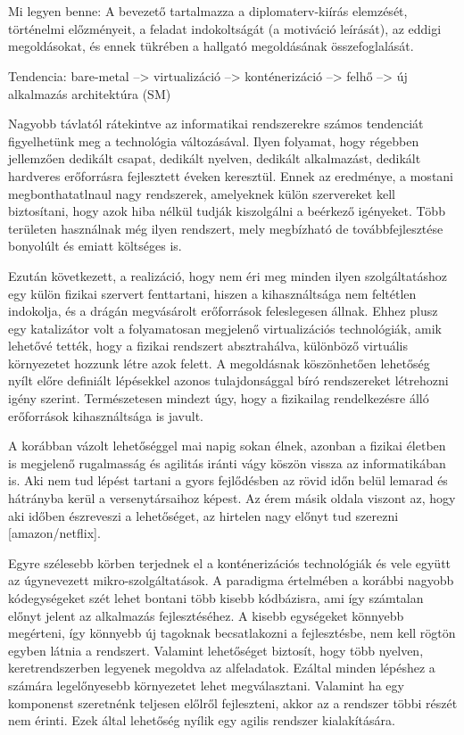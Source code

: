\chapter{\bevezetes}

Mi legyen benne:
A bevezető tartalmazza a diplomaterv-kiírás elemzését, történelmi előzményeit, a feladat indokoltságát (a motiváció leírását), az eddigi megoldásokat, és ennek tükrében a hallgató megoldásának összefoglalását.

Tendencia: bare-metal --> virtualizáció --> konténerizáció --> felhő --> új alkalmazás architektúra (SM) 

Nagyobb távlatól rátekintve az informatikai rendszerekre számos tendenciát figyelhetünk meg a technológia változásával. Ilyen folyamat, hogy régebben jellemzően dedikált csapat, dedikált nyelven, dedikált alkalmazást, dedikált hardveres erőforrásra fejlesztett éveken keresztül. Ennek az eredménye, a mostani megbonthatatlnaul nagy rendszerek, amelyeknek külön szervereket kell biztosítani, hogy azok hiba nélkül tudják kiszolgálni a beérkező igényeket. Több területen használnak még ilyen rendszert, mely megbízható de továbbfejlesztése bonyolúlt és emiatt költséges is.

Ezután következett, a realizáció, hogy nem éri meg minden ilyen szolgáltatáshoz egy külön fizikai szervert fenttartani, hiszen a kihasználtsága nem feltétlen indokolja, és a drágán megvásárolt erőforrások feleslegesen állnak. Ehhez plusz egy katalizátor volt a folyamatosan megjelenő virtualizációs technológiák, amik lehetővé tették, hogy a fizikai rendszert absztrahálva, különböző virtuális környezetet hozzunk létre azok felett. A megoldásnak köszönhetően lehetőség nyílt előre definiált lépésekkel azonos tulajdonsággal bíró rendszereket létrehozni igény szerint. Természetesen mindezt úgy, hogy a fizikailag rendelkezésre álló erőforrások kihasználtsága is javult.

A korábban vázolt lehetőséggel mai napig sokan élnek, azonban a fizikai életben is megjelenő rugalmasság és agilitás iránti vágy köszön vissza az informatikában is. Aki nem tud lépést tartani a gyors fejlődésben az rövid időn belül lemarad és hátrányba kerül a versenytársaihoz képest. Az érem másik oldala viszont az, hogy aki időben észreveszi a lehetőséget, az hirtelen nagy előnyt tud szerezni [amazon/netflix].

Egyre szélesebb körben terjednek el a konténerizációs technológiák és vele együtt az úgynevezett mikro-szolgáltatások. A paradigma értelmében a korábbi nagyobb kódegységeket szét lehet bontani több kisebb kódbázisra, ami így számtalan előnyt jelent az alkalmazás fejlesztéséhez. A kisebb egységeket könnyebb megérteni, így könnyebb új tagoknak becsatlakozni a fejlesztésbe, nem kell rögtön egyben látnia a rendszert. Valamint lehetőséget biztosít, hogy több nyelven, keretrendszerben legyenek megoldva az alfeladatok. Ezáltal minden lépéshez a számára legelőnyesebb környezetet lehet megválasztani. Valamint ha egy komponenst szeretnénk teljesen előlről fejleszteni, akkor az a rendszer többi részét nem érinti. Ezek által lehetőség nyílik egy agilis rendszer kialakítására.

